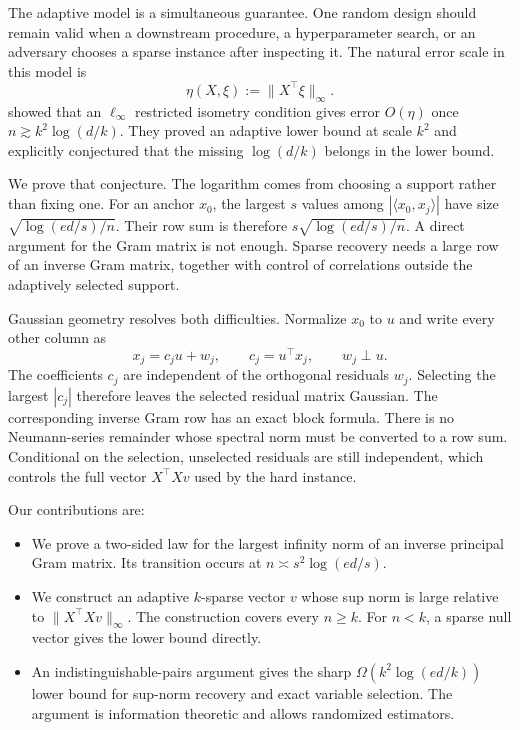 \documentclass[twoside]{article}
\begin{document}
The adaptive model is a simultaneous guarantee. One random design should remain valid when a downstream procedure, a hyperparameter search, or an adversary chooses a sparse instance after inspecting it. The natural error scale in this model is \[ \eta(X,\xi):=\|X^\top\xi\|_\infty. \] \citet{chen2026adaptive} showed that an $\ell_\infty$ restricted isometry condition gives error $O(\eta)$ once $n\gtrsim k^2\log(d/k)$. They proved an adaptive lower bound at scale $k^2$ and explicitly conjectured that the missing $\log(d/k)$ belongs in the lower bound.

We prove that conjecture. The logarithm comes from choosing a support rather than fixing one. For an anchor $x_0$, the largest $s$ values among $|\langle x_0,x_j\rangle|$ have size $\sqrt{\log(ed/s)/n}$. Their row sum is therefore $s\sqrt{\log(ed/s)/n}$. A direct argument for the Gram matrix is not enough. Sparse recovery needs a large row of an inverse Gram matrix, together with control of correlations outside the adaptively selected support.

Gaussian geometry resolves both difficulties. Normalize $x_0$ to $u$ and write every other column as \[ x_j=c_j u+w_j, \qquad c_j=u^\top x_j, \qquad w_j\perp u. \] The coefficients $c_j$ are independent of the orthogonal residuals $w_j$. Selecting the largest $|c_j|$ therefore leaves the selected residual matrix Gaussian. The corresponding inverse Gram row has an exact block formula. There is no Neumann-series remainder whose spectral norm must be converted to a row sum. Conditional on the selection, unselected residuals are still independent, which controls the full vector $X^\top Xv$ used by the hard instance.

Our contributions are:
\begin{itemize}
\item We prove a two-sided law for the largest infinity norm of an inverse
principal Gram matrix. Its transition occurs at $n\asymp s^2\log(ed/s)$.
\item We construct an adaptive $k$-sparse vector $v$ whose sup norm is large
relative to $\|X^\top Xv\|_\infty$. The construction covers every $n\geq k$. For $n<k$, a sparse null vector gives the lower bound directly.
\item An indistinguishable-pairs argument gives the sharp
$\Omega(k^2\log(ed/k))$ lower bound for sup-norm recovery and exact variable selection. The argument is information theoretic and allows randomized estimators.
\end{itemize}
\end{document}
